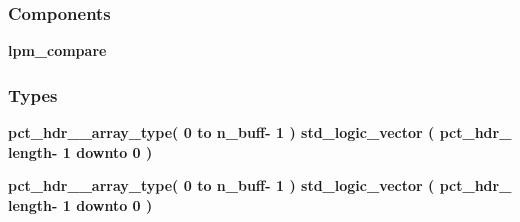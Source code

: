 \subsubsection*{Components}
 \begin{DoxyCompactItemize}
\item 
{\bf lpm\+\_\+compare}  {\bfseries }  
\end{DoxyCompactItemize}
\subsubsection*{Types}
 \begin{DoxyCompactItemize}
\item 
{\bfseries {\bf pct\+\_\+hdr\+\_\+\_\+array\+\_\+type}{\bfseries \textcolor{vhdlchar}{(}\textcolor{vhdlchar}{ }\textcolor{vhdlchar}{ } \textcolor{vhdldigit}{0} \textcolor{vhdlchar}{ }\textcolor{keywordflow}{to}\textcolor{vhdlchar}{ }\textcolor{vhdlchar}{ }\textcolor{vhdlchar}{ }\textcolor{vhdlchar}{ }\textcolor{vhdlchar}{n\+\_\+buff}\textcolor{vhdlchar}{-\/}\textcolor{vhdlchar}{ } \textcolor{vhdldigit}{1} \textcolor{vhdlchar}{ }\textcolor{vhdlchar}{)}\textcolor{vhdlchar}{ }\textcolor{vhdlchar}{ }\textcolor{comment}{std\+\_\+logic\+\_\+vector}\textcolor{vhdlchar}{ }\textcolor{vhdlchar}{(}\textcolor{vhdlchar}{ }\textcolor{vhdlchar}{ }\textcolor{vhdlchar}{ }\textcolor{vhdlchar}{ }{\bfseries {\bf pct\+\_\+hdr\+\_}} \textcolor{vhdlchar}{ }\textcolor{vhdlchar}{\textquotesingle{}}\textcolor{vhdlchar}{ }\textcolor{vhdlkeyword}{length}\textcolor{vhdlchar}{-\/}\textcolor{vhdlchar}{ } \textcolor{vhdldigit}{1} \textcolor{vhdlchar}{ }\textcolor{keywordflow}{downto}\textcolor{vhdlchar}{ }\textcolor{vhdlchar}{ } \textcolor{vhdldigit}{0} \textcolor{vhdlchar}{ }\textcolor{vhdlchar}{)}\textcolor{vhdlchar}{ }}} 
\item 
{\bfseries {\bf pct\+\_\+hdr\+\_\+\_\+array\+\_\+type}{\bfseries \textcolor{vhdlchar}{(}\textcolor{vhdlchar}{ }\textcolor{vhdlchar}{ } \textcolor{vhdldigit}{0} \textcolor{vhdlchar}{ }\textcolor{keywordflow}{to}\textcolor{vhdlchar}{ }\textcolor{vhdlchar}{ }\textcolor{vhdlchar}{ }\textcolor{vhdlchar}{ }\textcolor{vhdlchar}{n\+\_\+buff}\textcolor{vhdlchar}{-\/}\textcolor{vhdlchar}{ } \textcolor{vhdldigit}{1} \textcolor{vhdlchar}{ }\textcolor{vhdlchar}{)}\textcolor{vhdlchar}{ }\textcolor{vhdlchar}{ }\textcolor{comment}{std\+\_\+logic\+\_\+vector}\textcolor{vhdlchar}{ }\textcolor{vhdlchar}{(}\textcolor{vhdlchar}{ }\textcolor{vhdlchar}{ }\textcolor{vhdlchar}{ }\textcolor{vhdlchar}{ }{\bfseries {\bf pct\+\_\+hdr\+\_}} \textcolor{vhdlchar}{ }\textcolor{vhdlchar}{\textquotesingle{}}\textcolor{vhdlchar}{ }\textcolor{vhdlkeyword}{length}\textcolor{vhdlchar}{-\/}\textcolor{vhdlchar}{ } \textcolor{vhdldigit}{1} \textcolor{vhdlchar}{ }\textcolor{keywordflow}{downto}\textcolor{vhdlchar}{ }\textcolor{vhdlchar}{ } \textcolor{vhdldigit}{0} \textcolor{vhdlchar}{ }\textcolor{vhdlchar}{)}\textcolor{vhdlchar}{ }}} 

\end{DoxyCompactItemize}

